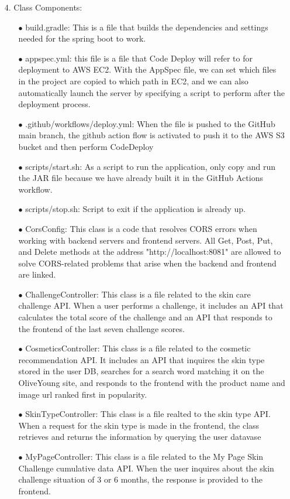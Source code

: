 \documentclass[conference]{IEEEtran}
\begin{document}
\begin{itemize}
    \item[4.]  Class Components: 
    \begin{itemize}
        \item[$\bullet$] build.gradle: This is a file that builds the dependencies and settings needed for the spring boot to work.
        \item[$\bullet$] appspec.yml: this file is a file that Code Deploy will refer to for deployment to AWS EC2. With the AppSpec file, we can set which files in the project are copied to which path in EC2, and we can also automatically launch the server by specifying a script to perform after the deployment process.
        \item[$\bullet$] .github/workflows/deploy.yml: When the file is pushed to the GitHub main branch, the github action flow is activated to push it to the AWS S3 bucket and then perform CodeDeploy
        \item[$\bullet$] scripts/start.sh: As a script to run the application, only copy and run the JAR file because we have already built it in the GitHub Actions workflow.
        \item[$\bullet$] scripts/stop.sh: Script to exit if the application is already up.
        \item[$\bullet$] CorsConfig: This class is a code that resolves CORS errors when working with backend servers and frontend servers. All Get, Post, Put, and Delete methods at the address "http://localhost:8081" are allowed to solve CORS-related problems that arise when the backend and frontend are linked.
        \item[$\bullet$] ChallengeController: This class is a file related to the skin care challenge API. When a user performs a challenge, it includes an API that calculates the total score of the challenge and an API that responds to the frontend of the last seven challenge scores.
        \item[$\bullet$] CosmeticsController: This class is a file related to the cosmetic recommendation API. It includes an API that inquires the skin type stored in the user DB, searches for a search word matching it on the OliveYoung site, and responds to the frontend with the product name and image url ranked first in popularity.
        \item[$\bullet$] SkinTypeController: This class is a file realted to the skin type API. When a request for the skin type is made in the frontend, the class retrieves and returns the information by querying the user datavase
        \item[$\bullet$] MyPageController: This class is a file related to the My Page Skin Challenge cumulative data API. When the user inquires about the skin challenge situation of 3 or 6 months, the response is provided to the frontend.

\end{itemize}
\end{itemize}
\end{document}
